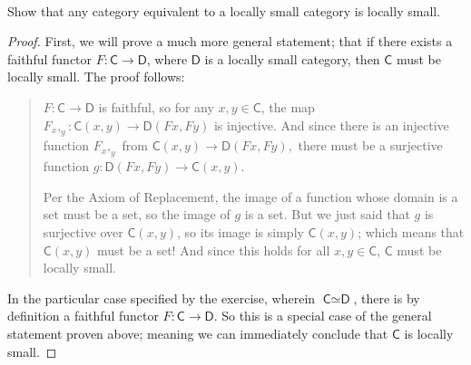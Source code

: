 \documentclass[main.tex]{subfiles}
\begin{document}
\paragraph{}
\begin{exercise}
	Show that any category equivalent to a locally small category is locally
	small.
\end{exercise}

\begin{proof}
	First, we will prove a much more general statement; that if there exists a
	faithful functor \(F \colon \textsf{C} \to \textsf{D}\), where
	\(\textsf{D}\) is a locally small category, then \(\textsf{C}\) must be
	locally small. The proof follows:

\begin{quotation}
	\(F \colon \textsf{C} \to \textsf{D}\) is faithful, so for any \(x, y \in
	\textsf{C}\), the map \(F_x,_y \colon \textsf{C}(x, y) \to \textsf{D}(Fx,
	Fy)\) is injective. And since there is an injective function \(F_x,_y\) from
	\(\textsf{C}(x, y) \to \textsf{D}(Fx, Fy),\) there must be a surjective
	function \(g \colon \textsf{D}(Fx, Fy) \to \textsf{C}(x,
	y)\)\footnotemark[1].
	
	Per the Axiom of Replacement, the image of a function whose domain is a set
	must be a set, so the image of \(g\) is a set. But we just said that \(g\)
	is surjective over \(\textsf{C}(x, y)\), so its image is simply
	\(\textsf{C}(x, y)\); which means that \(\textsf{C}(x, y)\) must be a set!
	And since this holds for all \(x, y \in \textsf{C}\), \(\textsf{C}\) must be
	locally small.
\end{quotation}

In the particular case specified by the exercise, wherein \(\textsf{C} \simeq
\textsf{D}\), there is by definition a faithful functor \(F \colon \textsf{C}
\to \textsf{D}\). So this is a special case of the general statement proven
above; meaning we can immediately conclude that \(\textsf{C}\) is locally small.

\end{proof}
\end{document}
